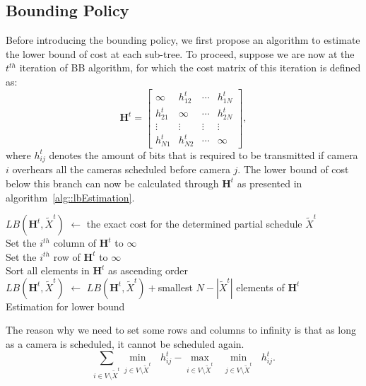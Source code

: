 \subsection{Bounding Policy}
Before introducing the bounding policy, we first propose an algorithm to estimate the lower bound of cost at each sub-tree.
To proceed, suppose we are now at the $t^{th}$ iteration of BB algorithm, for which the cost matrix of this iteration is defined as:
\begin{equation}
\mathbf{H}^t = \left[ \begin{array}{cccc}
\infty &h_{12}^t &\cdots &h_{1N}^t \\
h_{21}^t &\infty &\cdots &h_{2N}^t \\
\vdots &\vdots &\vdots &\vdots \\
h_{N1}^t &h_{N2}^t &\cdots &\infty
\end{array} \right],
\label{eq::bbCostMatrix}
\end{equation}
where $h_{ij}^t$ denotes the amount of bits that is required to be transmitted if camera $i$ overhears all the cameras scheduled before camera $j$.
The lower bound of cost below this branch can now be calculated through $\mathbf{H}^t$ as presented in algorithm~\ref{alg::lbEstimation}.
%
\IncMargin{1em}
\begin{algorithm}[]
 \SetAlgoLined
 \BlankLine
 $LB(\mathbf{H}^t,\tilde{X}^t)$ $\gets$ the exact cost for the determined partial schedule $\tilde{X}^t$ \\
 {
 	Set the $i^{th}$ column of $\mathbf{H}^t$ to $\infty$ \\
 	Set the $i^{th}$ row of $\mathbf{H}^t$ to $\infty$ \\
 }
 Sort all elements in $\mathbf{H}^t$ as ascending order \\
 $LB(\mathbf{H}^t,\tilde{X}^t)$ $\gets$ $LB(\mathbf{H}^t,\tilde{X}^t)+$smallest $N-|\tilde{X}^t|$ elements of $\mathbf{H}^t$ \\
 \caption{\label{alg::lbEstimation}Estimation for lower bound}
\end{algorithm}
\DecMargin{1em}
%
The reason why we need to set some rows and columns to infinity is that as long as a camera is scheduled, it cannot be scheduled again.
\begin{equation}
\sum_{i\in V\setminus \tilde{X}^t} \underset{j \in V\setminus \tilde{X}^t}{\min}\text{ }h_{ij}^{t} - 
\underset{i\in V\setminus \tilde{X}^t}{\max} \text{ } \underset{j \in V\setminus \tilde{X}^t}{\min}\text{ }h_{ij}^{t}.
\end{equation}
%
